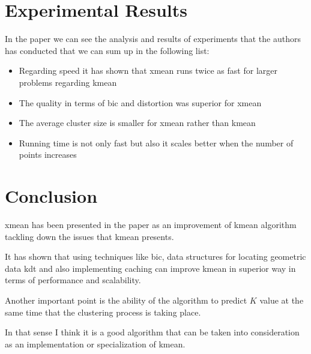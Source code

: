 \documentclass[12pt, a4paper]{article}
\begin{document}
\section{Experimental Results}
In the paper \cite{xmean} we can see the analysis and results of experiments that the authors has conducted that we can sum up in the following list:

\begin{itemize}
  \item Regarding speed it has shown that \acrshort{xmean} runs twice as fast for larger problems regarding \acrshort{kmean}
  \item The quality in terms of \acrshort{bic} and distortion was superior for \acrshort{xmean}
  \item The average cluster size is smaller for \acrshort{xmean} rather than \acrshort{kmean}
  \item Running time is not only fast but also it scales better when the number of points increases
\end{itemize}

\section{Conclusion}
\acrfull{xmean} has been presented in the paper as an improvement of \acrshort{kmean} algorithm tackling down the issues that \acrshort{kmean} presents.

It has shown that using techniques like \acrshort{bic}, data structures for locating geometric data \acrshort{kdt} and also implementing caching can improve \acrshort{kmean} in superior way in terms of performance and scalability.

Another important point is the ability of the algorithm to predict $K$ value at the same time that the clustering process is taking place.

In that sense I think it is a good algorithm that can be taken into consideration as an implementation or specialization of \acrshort{kmean}.



\end{document}
